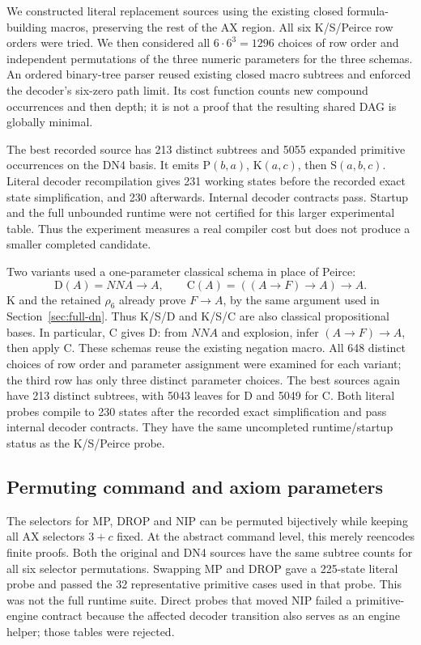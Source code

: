 We constructed literal replacement sources using the existing closed
formula-building macros, preserving the rest of the AX region.
All six K/S/Peirce row orders were tried.  We then considered all
$6\cdot6^3=1296$ choices of row order and independent permutations of
the three numeric parameters for the three schemas.  An ordered
binary-tree parser reused existing closed macro subtrees and enforced
the decoder's six-zero path limit.  Its cost function counts new
compound occurrences and then depth; it is not a proof that the
resulting shared DAG is globally minimal.

The best recorded source has 213 distinct subtrees and 5055 expanded
primitive occurrences on the DN4 basis.  It emits
$\mathrm P(b,a)$, $\mathrm K(a,c)$, then
$\mathrm S(a,b,c)$.  Literal decoder recompilation gives 231 working
states before the recorded exact state simplification, and 230
afterwards.  Internal decoder contracts pass.  Startup and the full
unbounded runtime were not certified for this larger experimental
table.  Thus the experiment measures a real compiler cost but does
not produce a smaller completed candidate.

Two variants used a one-parameter classical schema in place of Peirce:
\[
 \mathrm D(A)=NN A\to A,
 \qquad
 \mathrm C(A)=((A\to F)\to A)\to A.
\]
K and the retained $\rho_6$ already prove $F\to A$, by the same
argument used in Section~\ref{sec:full-dn}.  Thus K/S/D and K/S/C
are also classical propositional bases.  In particular, C gives D:
from $NN A$ and explosion, infer $(A\to F)\to A$, then apply C.
These schemas reuse the existing negation macro.  All 648 distinct
choices of row order and parameter assignment were examined for each
variant; the third row has only three distinct parameter choices.
The best sources again have 213 distinct subtrees, with 5043 leaves
for D and 5049 for C.  Both literal probes compile to 230 states after
the recorded exact simplification and pass internal decoder contracts.
They have the same uncompleted runtime/startup status as the K/S/Peirce
probe.

\subsection{Permuting command and axiom parameters}

The selectors for MP, DROP and NIP can be permuted bijectively while
keeping all AX selectors $3+c$ fixed.  At the abstract command level,
this merely reencodes finite proofs.  Both the original and DN4 sources
have the same subtree counts for all six selector permutations.
Swapping MP and DROP gave a 225-state literal probe and passed the
32 representative primitive cases used in that probe.  This was not
the full runtime suite.  Direct probes that moved NIP failed a
primitive-engine contract because the affected decoder transition
also serves as an engine helper; those tables were rejected.

